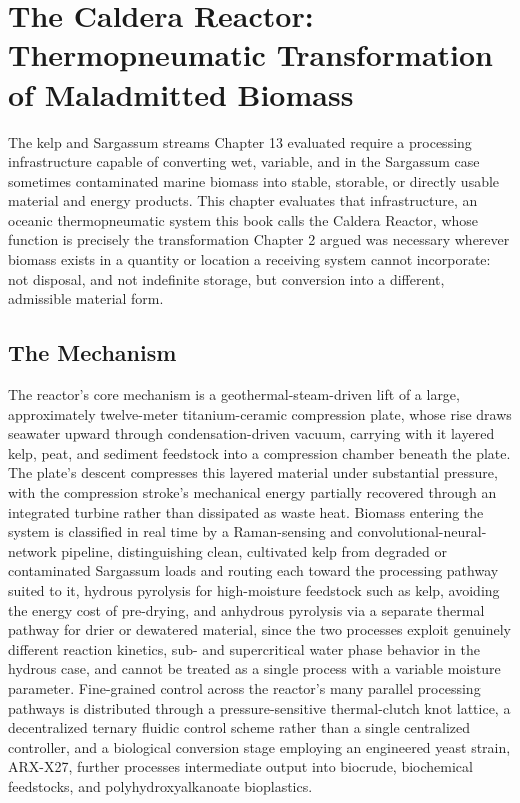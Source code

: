 \documentclass[11pt,oneside]{book}
\begin{document}
\chapter{The Caldera Reactor: Thermopneumatic Transformation of Maladmitted Biomass}

The kelp and Sargassum streams Chapter 13 evaluated require a processing infrastructure capable of converting wet, variable, and in the Sargassum case sometimes contaminated marine biomass into stable, storable, or directly usable material and energy products. This chapter evaluates that infrastructure, an oceanic thermopneumatic system this book calls the Caldera Reactor, whose function is precisely the transformation Chapter 2 argued was necessary wherever biomass exists in a quantity or location a receiving system cannot incorporate: not disposal, and not indefinite storage, but conversion into a different, admissible material form.

\section*{The Mechanism}

The reactor's core mechanism is a geothermal-steam-driven lift of a large, approximately twelve-meter titanium-ceramic compression plate, whose rise draws seawater upward through condensation-driven vacuum, carrying with it layered kelp, peat, and sediment feedstock into a compression chamber beneath the plate. The plate's descent compresses this layered material under substantial pressure, with the compression stroke's mechanical energy partially recovered through an integrated turbine rather than dissipated as waste heat. Biomass entering the system is classified in real time by a Raman-sensing and convolutional-neural-network pipeline, distinguishing clean, cultivated kelp from degraded or contaminated Sargassum loads and routing each toward the processing pathway suited to it, hydrous pyrolysis for high-moisture feedstock such as kelp, avoiding the energy cost of pre-drying, and anhydrous pyrolysis via a separate thermal pathway for drier or dewatered material, since the two processes exploit genuinely different reaction kinetics, sub- and supercritical water phase behavior in the hydrous case, and cannot be treated as a single process with a variable moisture parameter. Fine-grained control across the reactor's many parallel processing pathways is distributed through a pressure-sensitive thermal-clutch knot lattice, a decentralized ternary fluidic control scheme rather than a single centralized controller, and a biological conversion stage employing an engineered yeast strain, ARX-X27, further processes intermediate output into biocrude, biochemical feedstocks, and polyhydroxyalkanoate bioplastics.
\end{document}
